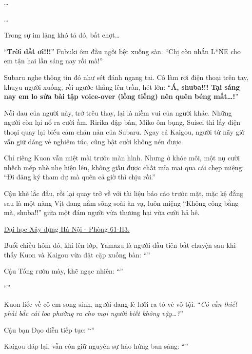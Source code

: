 \documentclass[../main.tex]{subfiles}
\begin{document}
\dots

\dots

Trong sự im lặng khó tả đó, bất chợt\dots

``\textbf{Trời đất ơi!!!}'' Fubuki ôm đầu ngồi bệt xuống sàn. ``Chị còn nhắn L*NE cho em tận hai lần sáng nay rồi mà!''

Subaru nghe thông tin đó như sét đánh ngang tai. Cô làm rơi điện thoại trên tay, khuỵu người xuống, rồi ngước thẳng lên trần, hét lớn: ``\textbf{Á, shuba!!! Tại sáng nay em lo sửa bài tập voice-over (lồng tiếng) nên quên béng mất\dots!}''

Nỗi đau của người này, trớ trêu thay, lại là niềm vui của người khác. Những người còn lại nổ ra cười ầm. Ririka đập bàn, Miko ôm bụng, Suisei thì lấy điện thoại quay lại biểu cảm chán nản của Subaru. Ngay cả Kaigou, người từ nãy giờ vẫn giữ dáng vẻ nghiêm túc, cũng bật cười không nén được.

Chỉ riêng Kuon vẫn miệt mài trước màn hình. Nhưng ở khóe môi, một nụ cười nhếch mép nhè nhẹ hiện lên, không giấu được chất mỉa mai qua cái chẹp miệng:  ``Đi đăng ký tham dự mà quên cả giờ thì chịu rồi.''

Cậu khẽ lắc đầu, rồi lại quay trở về với tài liệu báo cáo trước mặt, mặc kệ đằng sau là một nàng Vịt đang nằm sõng soài ăn vạ, luôn miệng ``Không công bằng mà, shuba!!'' giữa một đám người vừa thương hại vừa cười hả hê.

\begin{center}
    \uline{Đại học Xây dựng Hà Nội - Phòng 61-H3.}
\end{center}

Buổi chiều hôm đó, khi lên lớp, Yamazu là người đầu tiên bắt chuyện sau khi thấy Kuon và Kaigou vừa đặt cặp xuống bàn: ``''

Cậu Tổng rướn mày, khẽ ngạc nhiên: ``''

``''

Kuon liếc về cô em song sinh, người đang lè lưỡi ra tỏ vẻ vô tội. ``\textit{Có cần thiết phải bắc cái loa phường ra cho mọi người biết không vậy\dots?}''

Cậu bạn Đạo diễn tiếp tục: ``''

Kaigou đáp lại, vẫn còn giữ nguyên sự hào hứng ban sáng: ``''
\end{document}

